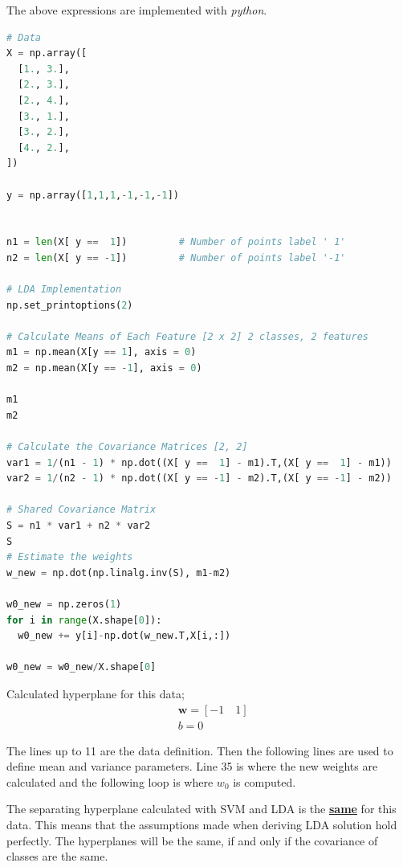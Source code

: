 \documentclass[11pt]{article}
\begin{document}
The above expressions are implemented with \emph{python}.
\begin{lstlisting}[language=Python, basicstyle=\tiny, caption=LDA Implementation]
# Data
X = np.array([
  [1., 3.],
  [2., 3.],
  [2., 4.],
  [3., 1.],
  [3., 2.],
  [4., 2.],
])

y = np.array([1,1,1,-1,-1,-1])


n1 = len(X[ y ==  1])         # Number of points label ' 1'
n2 = len(X[ y == -1])         # Number of points label '-1'

# LDA Implementation
np.set_printoptions(2)

# Calculate Means of Each Feature [2 x 2] 2 classes, 2 features
m1 = np.mean(X[y == 1], axis = 0)
m2 = np.mean(X[y == -1], axis = 0)

m1
m2

# Calculate the Covariance Matrices [2, 2]
var1 = 1/(n1 - 1) * np.dot((X[ y ==  1] - m1).T,(X[ y ==  1] - m1))     # (X[ y ==  1] - m1).shape = [3x2] 3 points, 2 features
var2 = 1/(n2 - 1) * np.dot((X[ y == -1] - m2).T,(X[ y == -1] - m2))     # (X[ y == -1] - m1).shape = [3x2] 3 points, 2 features

# Shared Covariance Matrix
S = n1 * var1 + n2 * var2
S
# Estimate the weights
w_new = np.dot(np.linalg.inv(S), m1-m2)

w0_new = np.zeros(1)
for i in range(X.shape[0]):
  w0_new += y[i]-np.dot(w_new.T,X[i,:])

w0_new = w0_new/X.shape[0]
\end{lstlisting}

Calculated hyperplane for this data;
\begin{align*}
    &\bm{w} = [-1 \quad 1] \\
    &b = 0
\end{align*}
    
The lines up to 11 are the data definition. Then the following lines are used to define mean and variance parameters. Line 35 is where the new weights are calculated and the following loop is where $w_0$ is computed. \medskip

The separating hyperplane calculated with SVM and LDA is the \textbf{\underline{same}} for this data. This means that the assumptions made when deriving LDA solution hold perfectly. The hyperplanes will be the same, if and only if the covariance of classes are the same.
\end{document}
